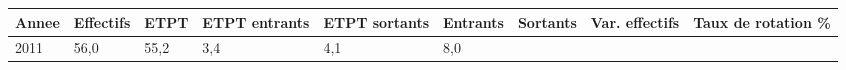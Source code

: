 \begin{longtable}[]{@{}lllllllll@{}}
\toprule
\begin{minipage}[b]{0.05\columnwidth}\raggedright
Annee\strut
\end{minipage} & \begin{minipage}[b]{0.08\columnwidth}\raggedright
Effectifs\strut
\end{minipage} & \begin{minipage}[b]{0.04\columnwidth}\raggedright
ETPT\strut
\end{minipage} & \begin{minipage}[b]{0.10\columnwidth}\raggedright
ETPT entrants\strut
\end{minipage} & \begin{minipage}[b]{0.10\columnwidth}\raggedright
ETPT sortants\strut
\end{minipage} & \begin{minipage}[b]{0.07\columnwidth}\raggedright
Entrants\strut
\end{minipage} & \begin{minipage}[b]{0.07\columnwidth}\raggedright
Sortants\strut
\end{minipage} & \begin{minipage}[b]{0.11\columnwidth}\raggedright
Var. effectifs\strut
\end{minipage} & \begin{minipage}[b]{0.14\columnwidth}\raggedright
Taux de rotation \%\strut
\end{minipage}\tabularnewline
\midrule
\endhead
\begin{minipage}[t]{0.05\columnwidth}\raggedright
2011\strut
\end{minipage} & \begin{minipage}[t]{0.08\columnwidth}\raggedright
56,0\strut
\end{minipage} & \begin{minipage}[t]{0.04\columnwidth}\raggedright
55,2\strut
\end{minipage} & \begin{minipage}[t]{0.10\columnwidth}\raggedright
3,4\strut
\end{minipage} & \begin{minipage}[t]{0.10\columnwidth}\raggedright
4,1\strut
\end{minipage} & \begin{minipage}[t]{0.07\columnwidth}\raggedright
8,0\strut
\end{minipage} & \begin{minipage}[t]{0.07\columnwidth}\raggedright

\end{minipage}
\end{longtable}
